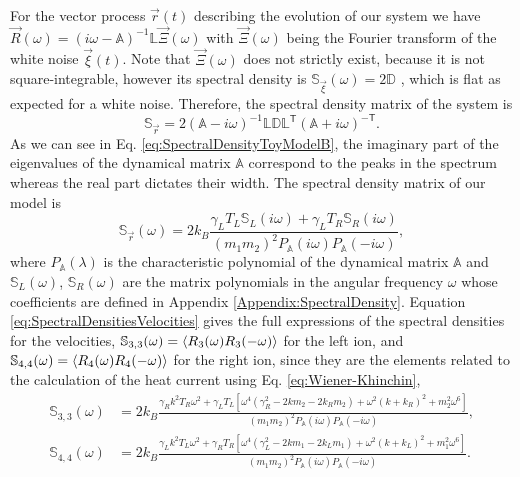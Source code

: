 For the vector process $\overrightarrow{r}(t)$ describing the evolution of our system we have $\overrightarrow{R}(\omega) = \left( i \omega - \mathbb{A} \right)^{-1}\mathbb{L}\overrightarrow{\Xi}(\omega)$ with $\overrightarrow{\Xi}(\omega)$ being the Fourier transform of the white noise $\overrightarrow{\xi}(t)$. Note that $\overrightarrow{\Xi}(\omega)$ does not strictly exist, because it is not square-integrable, however its spectral density is $\mathbb{S}_{\overrightarrow{\xi}}(\omega) = 2 \mathbb{D}$ \cite{Sarkka2019}, which is flat as expected for a white noise. Therefore, the spectral density matrix of the system is
%
\begin{equation}
  \mathbb{S}_{\overrightarrow{r}} = 2 \left(  \mathbb{A} - i\omega\right)^{-1}\mathbb{L}\mathbb{D}\mathbb{L}^\mathsf{T}\left(  \mathbb{A} + i\omega\right)^{-\mathsf{T}}.
  \label{eq:SpectralDensityToyModelB}
\end{equation}
%
As we can see in Eq. \eqref{eq:SpectralDensityToyModelB}, the imaginary part of the eigenvalues of the dynamical matrix $\mathbb{A}$ correspond to the peaks in the spectrum whereas the real part dictates their width. The spectral density matrix of our model is
%
\begin{equation}
  \mathbb{S}_{\overrightarrow{r}}(\omega) = 2 k_B \frac{\gamma_L T_L\mathbb{S}_L(i\omega)+\gamma_L T_R\mathbb{S}_R(i\omega)}{(m_1 m_2)^2 P_\mathbb{A}(i\omega)P_\mathbb{A}(-i\omega)},
\end{equation}
%
where $P_\mathbb{A}(\lambda)$ is the characteristic polynomial of the dynamical matrix $\mathbb{A}$ and $\mathbb{S}_L(\omega)$, $\mathbb{S}_R(\omega)$ are the matrix polynomials in the angular frequency $\omega$ whose coefficients are defined in Appendix \ref{Appendix:SpectralDensity}. Equation \eqref{eq:SpectralDensitiesVelocities} gives the full expressions of the spectral densities for the velocities, $\mathbb{S}_{3,3}(\omega) = \expval{R_3(\omega)R_3(-\omega)}$ for the left ion, and $\mathbb{S}_{4,4}(\omega) = \expval{R_4(\omega)R_4(-\omega)}$ for the right ion, since they are the elements related to the calculation of the heat current using Eq. \eqref{eq:Wiener-Khinchin},
%
\begin{align}
  \mathbb{S}_{3,3}(\omega) &= 2 k_B \frac{\gamma_R k^2 T_R \omega ^2+\gamma_L T_L \left[\omega ^4 \left(\gamma_R^2-2 k m_2-2 k_R m_2\right)+\omega ^2 (k+k_R)^2+m_2^2 \omega ^6\right]}{(m_1 m_2)^2 P_\mathbb{A}(i\omega)P_\mathbb{A}(-i\omega)},\nonumber\\
  \mathbb{S}_{4,4}(\omega) &= 2 k_B \frac{\gamma_L k^2 T_L \omega ^2+\gamma_R T_R \left[\omega ^4 \left(\gamma_L^2-2 k m_1-2 k_L m_1\right)+\omega ^2 (k+k_L)^2+m_1^2 \omega ^6\right]}{(m_1 m_2)^2 P_\mathbb{A}(i\omega)P_\mathbb{A}(-i\omega)}.
  \label{eq:SpectralDensitiesVelocities}
\end{align}

